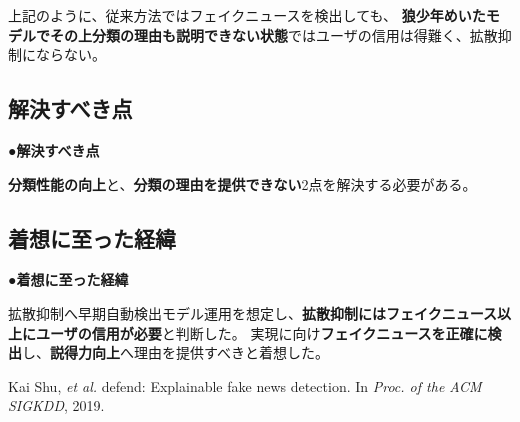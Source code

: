 {	上記のように、従来⽅法ではフェイクニュースを検出しても、
	\textbf{狼少年めいたモデルでその上分類の理由も説明できない状態}ではユーザの信用は得難く、拡散抑制にならない。

	\subsection{解決すべき点}
	\noindent
	●\textbf{解決すべき点}

	\textbf{分類性能の向上}と、\textbf{分類の理由を提供できない}2点を解決する必要がある。

	\subsection{着想に至った経緯}
	\noindent
	●\textbf{着想に至った経緯}

	拡散抑制へ早期自動検出モデル運用を想定し、\textbf{拡散抑制にはフェイクニュース以上にユーザの信用が必要}と判断した。
	実現に向け\textbf{フェイクニュースを正確に検出}し、\textbf{説得力向上}へ理由を提供すべきと着想した。

	{\footnotesize
		\begin{thebibliography}{99}
			\vspace*{-1mm}
			\setlength{\parskip}{0cm}
			\setlength{\itemsep}{0cm}
			\setcounter{enumiv}{6}
			\begin{spacing}{0.7}
				 Kai Shu, \textit{et al.} defend: Explainable fake news detection. In \textit{Proc. of the ACM SIGKDD}, 2019.
			\end{spacing}
			\end{thebibliography}
			
	}
}

